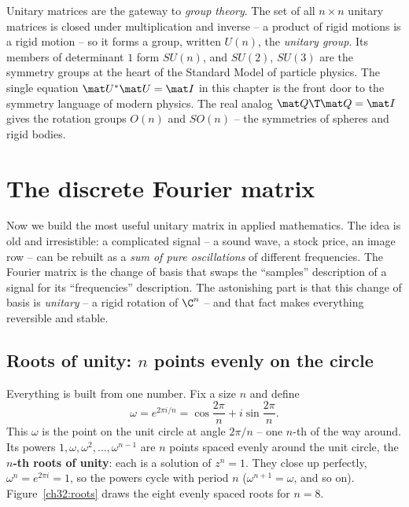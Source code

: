 \begin{connectionbox}
Unitary matrices are the gateway to \emph{group theory}. The set of all $n\times n$
unitary matrices is closed under multiplication and inverse -- a product of rigid
motions is a rigid motion -- so it forms a group, written $U(n)$, the
\emph{unitary group}. Its members of determinant $1$ form $SU(n)$, and $SU(2)$,
$SU(3)$ are the symmetry groups at the heart of the Standard Model of particle
physics. The single equation $\mat U^{*}\mat U=\mat I$ in this chapter is the front
door to the symmetry language of modern physics. The real analog
$\mat Q\T\mat Q=\mat I$ gives the rotation groups $O(n)$ and $SO(n)$ -- the
symmetries of spheres and rigid bodies.
\end{connectionbox}

\section{The discrete Fourier matrix}

Now we build the most useful unitary matrix in applied mathematics. The idea is
old and irresistible: a complicated signal -- a sound wave, a stock price, an image
row -- can be rebuilt as a \emph{sum of pure oscillations} of different
frequencies. The Fourier matrix is the change of basis that swaps the ``samples''
description of a signal for its ``frequencies'' description. The astonishing part
is that this change of basis is \emph{unitary} -- a rigid rotation of $\C^n$ -- and
that fact makes everything reversible and stable.

\subsection{Roots of unity: $n$ points evenly on the circle}

Everything is built from one number. Fix a size $n$ and define
\[
  \omega = e^{2\pi i/n} = \cos\frac{2\pi}{n} + i\sin\frac{2\pi}{n}.
\]
This $\omega$ is the point on the unit circle at angle $2\pi/n$ -- one $n$-th of the
way around. Its powers $1,\omega,\omega^2,\dots,\omega^{n-1}$ are $n$ points spaced
evenly around the unit circle, the \textbf{$n$-th roots of unity}: each is a
solution of $z^n=1$. They close up perfectly, $\omega^n = e^{2\pi i}=1$, so the
powers cycle with period $n$ ($\omega^{n+1}=\omega$, and so on).
Figure~\ref{ch32:roots} draws the eight evenly spaced roots for $n=8$.


